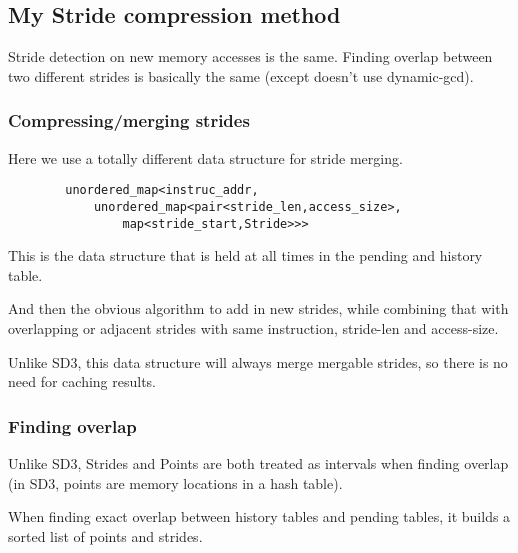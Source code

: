 \documentclass[12pt,twoside]{reedthesis}
\begin{document}
		
		
		
		\subsection{My Stride compression method}
		
		Stride detection on new memory accesses is the same. Finding overlap between two different strides is basically the same (except doesn't use dynamic-gcd).
		
		\subsubsection{Compressing/merging strides}
		
		Here we use a totally different data structure for stride merging.
		\begin{verbatim}
		unordered_map<instruc_addr,
		    unordered_map<pair<stride_len,access_size>,
		        map<stride_start,Stride>>>
		\end{verbatim}
		This is the data structure that is held at all times in the pending and history table. 
		
		And then the obvious algorithm to add in new strides, while combining that with overlapping or adjacent strides with same instruction, stride-len and access-size.
		
		Unlike SD3, this data structure will always merge mergable strides, so there is no need for caching results. 
		
		\subsubsection{Finding overlap}
		
		Unlike SD3, Strides and Points are both treated as intervals when finding overlap (in SD3, points are memory locations in a hash table). 
		
		When finding exact overlap between history tables and pending tables, it builds a sorted list of points and strides.
		
\end{document}
